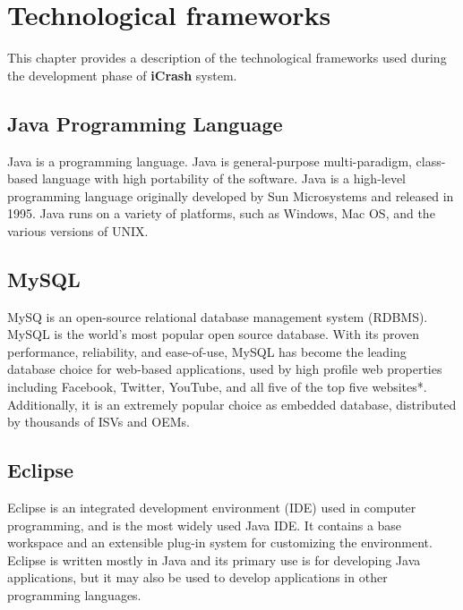 \chapter{Technological frameworks}
\label{chap:techFrm}



This chapter provides a description of the technological frameworks used during
the development phase of \textbf{iCrash} system.


\section{Java Programming Language}
\label{sec:Java}
Java is a programming language. Java is general-purpose multi-paradigm, class-based language with high
portability of the software. Java is a high-level programming language
originally developed by Sun Microsystems and released in 1995. Java runs on a variety of platforms, 
such as Windows, Mac OS, and the various versions of UNIX. 

\section{MySQL}
\label{sec:MySQL}
 MySQ is an open-source relational database management system (RDBMS). MySQL is the world's 
 most popular open source database. With its proven performance, reliability, and ease-of-use, 
 MySQL has become the leading database choice for web-based applications, used by high profile 
 web properties including Facebook, Twitter, YouTube, and all five of the top five websites*. 
 Additionally, it is an extremely popular choice as embedded database, distributed by thousands 
 of ISVs and OEMs.

\section{Eclipse}
\label{sec:eclipse}
Eclipse is an integrated development environment (IDE) used in computer
programming, and is the most widely used Java IDE. It contains a base workspace and an 
extensible plug-in system for customizing the environment. Eclipse is
written mostly in Java and its primary use is for developing Java applications,
but it may also be used to develop applications in other programming languages.

